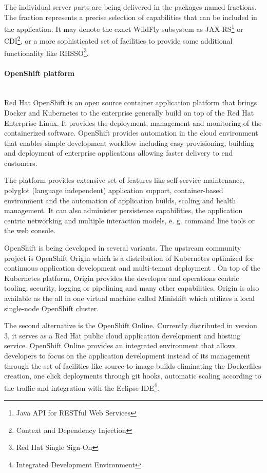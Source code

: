\documentclass[oneside,
  digital, %
  table,   %
  nolof,     %
  nolot,     %
]{fithesis3}
\newcommand{\newlinepar}[1]{\paragraph{#1}\needspace{4\baselineskip}\mbox{}\\}
\begin{document}
The individual server parts are being delivered in the packages named fractions. The fraction represents a precise selection of capabilities that can be included in the application. It may denote the exact WildFly subsystem as JAX-RS\footnote{Java API for RESTful Web Services} or CDI\footnote{Context and Dependency Injection}, or a more sophisticated set of facilities to provide some additional functionality like RHSSO\footnote{Red Hat Single Sign-On}.

\newlinepar{OpenShift platform}

Red Hat OpenShift is an open source container application platform that  brings Docker and Kubernetes to the enterprise \cite{openshift} generally build on top of the Red Hat Enterprise Linux. It provides the deployment, management and monitoring of the containerized software. OpenShift provides automation in the cloud environment that enables simple development workflow including easy provisioning, building and deployment of enterprise applications allowing faster delivery to end customers.

The platform provides extensive set of features like self-service maintenance, polyglot (language independent) application support, container-based environment and the automation of application builds, scaling and health management. It can also administer persistence capabilities, the application centric networking and multiple interaction models, e. g. command line tools or the web console.

OpenShift is being developed in several variants. The upstream community project is OpenShift Origin which is a distribution of Kubernetes optimized for continuous application development and multi-tenant deployment \cite{openshift}. On top of the Kubernetes platform, Origin provides the developer and operations centric tooling, security, logging or pipelining and many other capabilities. Origin is also available as the all in one virtual machine called Minishift which utilizes a local single-node OpenShift cluster. 

The second alternative is the OpenShift Online. Currently distributed in version 3, it serves as a Red Hat public cloud application development and hosting service. OpenShift Online provides an integrated environment that allows developers to focus on the application development instead of its management through the set of facilities like source-to-image builds eliminating the Dockerfiles creation, one click deployments through git hooks, automatic scaling according to the traffic and integration with the Eclipse IDE\footnote{Integrated Development Environment}.
\end{document}
